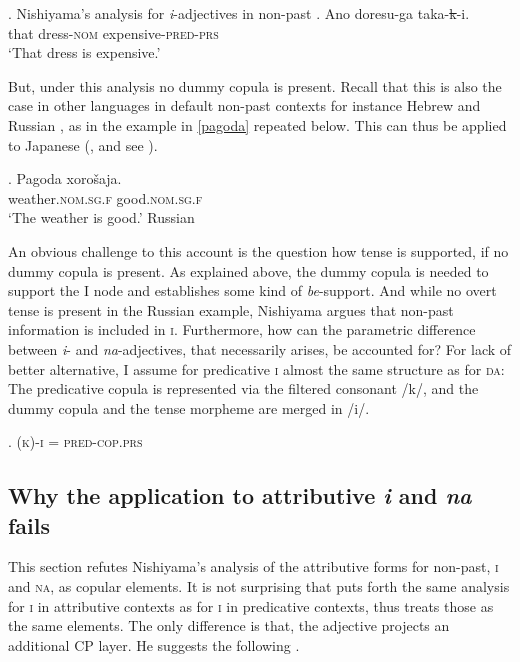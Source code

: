 \documentclass [output=book,colorlinks,citecolor=brown]{langscibook}
\begin{document}
\ex. Nishiyama's analysis for \textit{i}-adjectives in non-past
\ag. Ano doresu-ga taka-\st{k}-i.\\
that dress-\textsc{nom} expensive-\textsc{pred-prs}\\
`That dress is expensive.'

But, under this analysis no dummy copula is present. Recall that this is also the case in other languages in default non-past contexts for instance Hebrew \citep{doron:1983:verbless, rapoport:1987:copular} and Russian \citep{babby:2010:syntactic}, as in the example in \ref{pagoda} repeated below. This can thus be applied to Japanese (\citealt[191–192]{nishiyama:1999:adj}, and see \citealt{urushibara:1993:syntactic}). %

\exg. Pagoda xorošaja.\\
weather.\textsc{nom.sg.f} good.\textsc{nom.sg.f}\\
`The weather is good.' \null \hfill Russian

An obvious challenge to this account is the question how tense is supported, if no dummy copula is present. As explained above, the dummy copula is needed to support the I node and establishes some kind of \textit{be}-support. And while no overt tense is present in the Russian example, Nishiyama argues that non-past information is included in \textsc{i}. Furthermore, how can the parametric difference between \textit{i}- and \textit{na}-adjectives, that necessarily arises, be accounted for? For lack of better alternative, I assume for predicative \textsc{i} almost the same structure as for \textsc{da}: The predicative copula is represented via the filtered consonant /k/, and the dummy copula and the tense morpheme are merged in /i/. %

\ex. \textsc{(k)-i} = \textsc{pred-cop.prs}

\subsection{Why the application to attributive \textit{i} and \textit{na} fails} \label{why it fails}

This section refutes Nishiyama's analysis of the attributive forms for non-past, \textsc{i} and \textsc{na}, as copular elements. It is not surprising that \citet{nishiyama:1999:adj} puts forth the same analysis for \textsc{i} in attributive contexts as for \textsc{i} in predicative contexts, thus treats those as the same elements. The only difference is that, the adjective projects an additional CP layer. He suggests the following \citep[199–202]{nishiyama:1999:adj}. %
\end{document}

